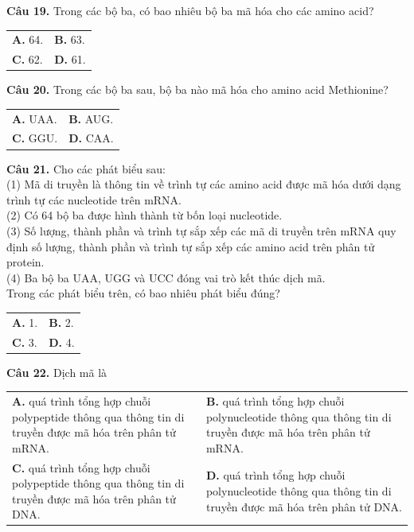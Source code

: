 \documentclass{article}
\begin{document}
\begin{minipage}[t][14.4cm][t]{\linewidth}
\fontsize{25}{33}\selectfont

\textbf{Câu 19.} Trong các bộ ba, có bao nhiêu bộ ba mã hóa cho các amino acid?\\[4pt]
\begin{tabularx}{\linewidth}{@{}X X@{}}
\textbf{A. } 64. & \textbf{B. } 63.\\[4pt]
\textbf{C. } 62. & \textbf{D. } 61.
\end{tabularx}
\vspace*{\fill}
\textbf{Câu 20.} Trong các bộ ba sau, bộ ba nào mã hóa cho amino acid Methionine?\\[4pt]
\begin{tabularx}{\linewidth}{@{}X X@{}}
\textbf{A. } UAA. & \textbf{B. } AUG.\\[4pt]
\textbf{C. } GGU. & \textbf{D. } CAA.
\end{tabularx}

\end{minipage}
\newpage


\begin{minipage}[t][14.4cm][t]{\linewidth}
\fontsize{18}{23}\selectfont

\textbf{Câu 21.} Cho các phát biểu sau:\\[3pt](1) Mã di truyền là thông tin về trình tự các amino acid được mã hóa dưới dạng trình tự các nucleotide trên mRNA.\\[3pt](2) Có 64 bộ ba được hình thành từ bốn loại nucleotide.\\[3pt](3) Số lượng, thành phần và trình tự sắp xếp các mã di truyền trên mRNA quy định số lượng, thành phần và trình tự sắp xếp các amino acid trên phân tử protein.\\[3pt](4) Ba bộ ba UAA, UGG và UCC đóng vai trò kết thúc dịch mã.\\[3pt]Trong các phát biểu trên, có bao nhiêu phát biểu đúng?\\[4pt]
\begin{tabularx}{\linewidth}{@{}X X@{}}
\textbf{A. } 1. & \textbf{B. } 2.\\[4pt]
\textbf{C. } 3. & \textbf{D. } 4.
\end{tabularx}
\vspace*{\fill}
\textbf{Câu 22.} Dịch mã là\\[4pt]
\begin{tabularx}{\linewidth}{@{}X X@{}}
\textbf{A. } quá trình tổng hợp chuỗi polypeptide thông qua thông tin di truyền được mã hóa trên phân tử mRNA. & \textbf{B. } quá trình tổng hợp chuỗi polynucleotide thông qua thông tin di truyền được mã hóa trên phân tử mRNA.\\[4pt]
\textbf{C. } quá trình tổng hợp chuỗi polypeptide thông qua thông tin di truyền được mã hóa trên phân tử DNA. & \textbf{D. } quá trình tổng hợp chuỗi polynucleotide thông qua thông tin di truyền được mã hóa trên phân tử DNA.
\end{tabularx}

\end{minipage}
\newpage
\end{document}
